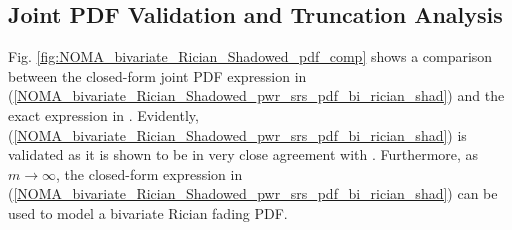\begin{table}[]
\centering
\caption{Simulation Parameters} \vspace{0.1cm}
\label{table:NOMA_bivariate_Rician_Shadowed_sim_param}
\end{table}

\subsection{Joint PDF Validation and Truncation Analysis}

Fig. \ref{fig:NOMA_bivariate_Rician_Shadowed_pdf_comp} shows a comparison between the closed-form joint PDF expression in (\ref{NOMA_bivariate_Rician_Shadowed_pwr_srs_pdf_bi_rician_shad}) and the exact expression in \cite[eq. (4)]{lopez2018bivariate}. Evidently, (\ref{NOMA_bivariate_Rician_Shadowed_pwr_srs_pdf_bi_rician_shad}) is validated as it is shown to be in very close agreement with \cite[eq. (4)]{lopez2018bivariate}. Furthermore, as $m \to \infty$, the closed-form expression in (\ref{NOMA_bivariate_Rician_Shadowed_pwr_srs_pdf_bi_rician_shad}) can be used to model a bivariate Rician fading PDF. 

